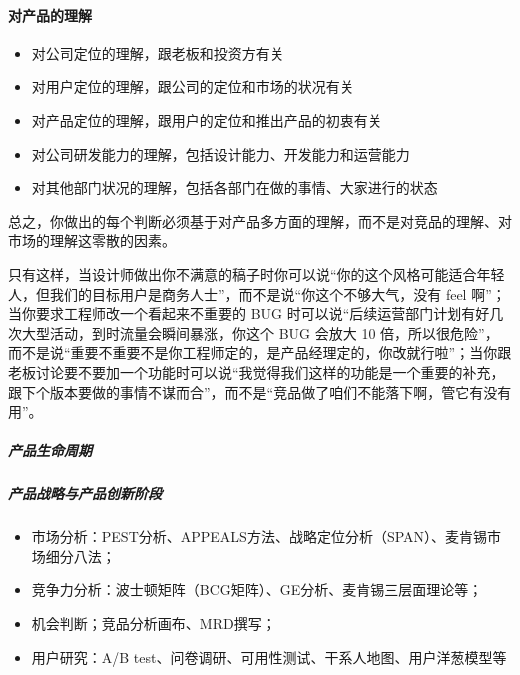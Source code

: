 \documentclass[letterpaper,11pt,english]{sphinxmanual}
\begin{document}
\paragraph{对产品的理解}
\label{\detokenize{chapter_introduction/ability:id9}}\begin{itemize}
\item {} 
对公司定位的理解，跟老板和投资方有关

\item {} 
对用户定位的理解，跟公司的定位和市场的状况有关

\item {} 
对产品定位的理解，跟用户的定位和推出产品的初衷有关

\item {} 
对公司研发能力的理解，包括设计能力、开发能力和运营能力

\item {} 
对其他部门状况的理解，包括各部门在做的事情、大家进行的状态

\end{itemize}

总之，你做出的每个判断必须基于对产品多方面的理解，而不是对竞品的理解、对市场的理解这零散的因素。

只有这样，当设计师做出你不满意的稿子时你可以说“你的这个风格可能适合年轻人，但我们的目标用户是商务人士”，而不是说“你这个不够大气，没有
feel 啊”；当你要求工程师改一个看起来不重要的 BUG
时可以说“后续运营部门计划有好几次大型活动，到时流量会瞬间暴涨，你这个
BUG 会放大 10
倍，所以很危险”，而不是说“重要不重要不是你工程师定的，是产品经理定的，你改就行啦”；当你跟老板讨论要不要加一个功能时可以说“我觉得我们这样的功能是一个重要的补充，跟下个版本要做的事情不谋而合”，而不是“竞品做了咱们不能落下啊，管它有没有用”。%
\begin{footnote}[298]\sphinxAtStartFootnote
{}
%
\end{footnote}


\subparagraph{产品生命周期}
\label{\detokenize{chapter_introduction/ability:id10}}

\subparagraph{产品战略与产品创新阶段}
\label{\detokenize{chapter_introduction/ability:id11}}\begin{itemize}
\item {} 
市场分析：PEST分析、APPEALS方法、战略定位分析（SPAN）、麦肯锡市场细分八法；

\item {} 
竞争力分析：波士顿矩阵（BCG矩阵）、GE分析、麦肯锡三层面理论等；

\item {} 
机会判断；竞品分析画布、MRD撰写；

\item {} 
用户研究：A/B test、问卷调研、可用性测试、干系人地图、用户洋葱模型等

\end{itemize}
\end{document}
